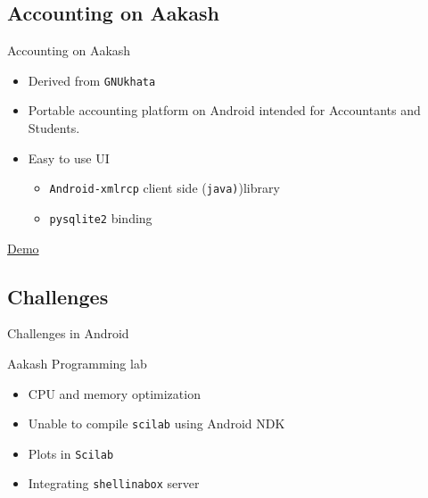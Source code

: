 \documentclass{beamer}
\begin{document}
  \subsection{Accounting on Aakash}
  \begin{frame}{Accounting on Aakash}
    \begin{itemize}
      \item Derived from {\tt GNUkhata}
      \item Portable accounting platform on Android intended for
        Accountants and Students.
      \item Easy to use UI
        \pause
        \begin{itemize}
          \item {\tt Android-xmlrcp} client side ({\tt java)})library
          \item {\tt pysqlite2} binding
        \end{itemize}
        \pause
    \end{itemize}
    \begin{block}{}
      \centerline{\href{file:///home/sachin/Videos/fossin/final.AVI}{Demo}}
    \end{block}
  \end{frame}

  \subsection{Challenges}
  \begin{frame}{Challenges in Android}
    \begin{block}{Aakash Programming lab}
      \begin{itemize}
        \item CPU and memory optimization
        \item Unable to compile {\tt scilab} using Android NDK
        \item Plots in {\tt Scilab}
        \item Integrating {\tt shellinabox} server
      \end{itemize}
    \end{block}
    \end{frame}
\end{document}
